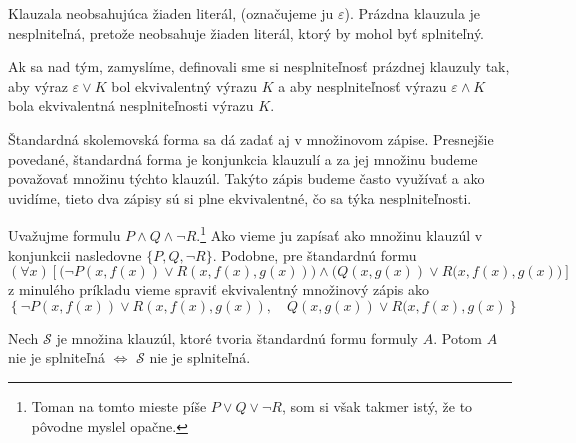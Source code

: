 \begin{definicia}
    Klauzala neobsahujúca žiaden literál, (označujeme ju $\varepsilon$).
    Prázdna klauzula je nesplniteľná, pretože neobsahuje žiaden
    literál, ktorý by mohol byť splniteľný.    
\end{definicia}
\begin{poznamka}
    Ak sa nad tým, zamyslíme, definovali sme si nesplniteľnosť
    prázdnej klauzuly tak, aby výraz $\varepsilon \lor K$ bol
    ekvivalentný výrazu $K$ a aby nesplniteľnosť výrazu
    $\varepsilon \land K$ bola ekvivalentná nesplniteľnosti
    výrazu $K$.
\end{poznamka}

\begin{poznamka}
    Štandardná skolemovská forma sa dá zadať aj v množinovom zápise.
    Presnejšie povedané, štandardná forma je konjunkcia klauzulí a
    za jej množinu budeme považovať množinu týchto klauzúl.
    Takýto zápis budeme často využívať a ako uvidíme, tieto dva zápisy
    sú si plne ekvivalentné, čo sa týka nesplniteľnosti.
\end{poznamka}


\begin{priklad}
    Uvažujme formulu $P \land Q \land \neg R$.\footnote{
    Toman na tomto mieste píše $P \lor Q \lor \neg R$, som si však
    takmer istý, že to pôvodne myslel opačne.
    }
    Ako vieme ju zapísať ako
    množinu klauzúl v konjunkcii nasledovne
    $\{P, Q, \neg R\}$.
    Podobne, pre štandardnú formu
    \begin{equation*}
        (\forall x) \left[
            \Big(\neg P(x,f(x)) \lor R(x,f(x),g(x)) \Big) \land
            \Big( Q(x,g(x))\lor R(x,f(x),g(x) \Big) \right]
    \end{equation*}
    z minulého príkladu vieme spraviť ekvivalentný množinový zápis ako
    \begin{equation*}
        \left\{
            \neg P(x,f(x)) \lor R(x,f(x),g(x)), \quad
            Q(x,g(x))\lor R(x,f(x),g(x) 
        \right\}
    \end{equation*}
\end{priklad}

\begin{veta}
    Nech $\mathscr{S}$ je množina klauzúl, ktoré tvoria štandardnú
    formu formuly $A$. Potom $A$ nie je splniteľná $\iff$ $\mathscr{S}$
    nie je splniteľná.
\end{veta}

